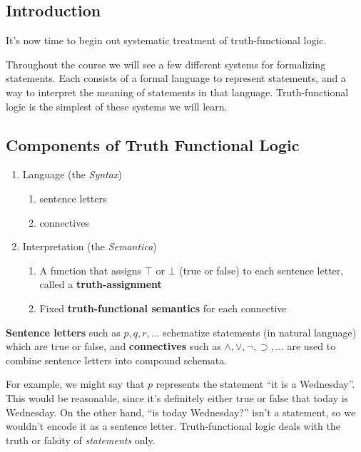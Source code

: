 \subsection{Introduction}

It's now time to begin out systematic treatment of truth-functional logic.

Throughout the course we will see a few different systems for formalizing statements. Each consists of a formal language to represent statements, and a way to interpret the meaning of statements in that language. Truth-functional logic is the simplest of these systems we will learn. 


\subsection{Components of Truth Functional Logic}

\begin{enumerate}
    \item Language (the \emph{Syntax})
    \begin{enumerate}
        \item sentence letters
        \item connectives
    \end{enumerate}
    \item Interpretation (the \emph{Semantica})
    \begin{enumerate}
        \item A function that assigns $\top$ or $\bot$ (true or false) to each sentence letter, called a \textbf{truth-assignment}
        \item Fixed \textbf{truth-functional semantics} for each connective
    \end{enumerate}
\end{enumerate}

\textbf{Sentence letters} such as $p, q, r, \ldots$ schematize statements (in natural language) which are true or false, and \textbf{connectives} such as $\wedge, \vee, \neg, \supset, \ldots$ are used to combine sentence letters into compound schemata. 

\begin{aside}
For example, we might say that $p$ represents the statement ``it is a Wednesday''. This would be reasonable, since it's definitely either true or false that today is Wednesday. On the other hand, ``is today Wednesday?'' isn't a statement, so we wouldn't encode it as a sentence letter. Truth-functional logic deals with the truth or falsity of \emph{statements} only. 
\end{aside}

